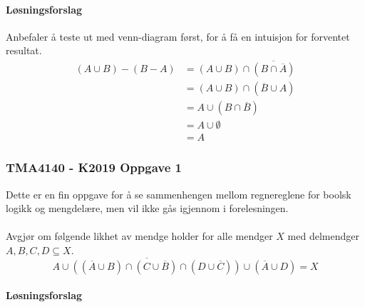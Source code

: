 \paragraph*{Løsningsforslag}
Anbefaler å teste ut med venn-diagram først, for å få en intuisjon for forventet resultat.
\begin{align*}
    (A\cup B)-(B-A) &= (A\cup B)\cap \overline{(B\cap\overline{A})}\\
    &= (A\cup B)\cap (\overline{B}\cup A)\\
    &= A\cup (B\cap \overline{B})\\
    &= A \cup \emptyset\\
    &= A
\end{align*}

\subsubsection{TMA4140 - K2019 Oppgave 1}

\qquad Dette er en fin oppgave for å se sammenhengen mellom regnereglene for boolsk logikk og mengdelære, men vil ikke gås igjennom i forelesningen. 
\\\\

Avgjør om følgende likhet av mendge holder for alle mendger $X$ med
delmendger $A,B,C,D \subseteq X$.
\[
\overline{A \cup ((\overline{A} \cup B)\cap (C\cup \overline{B})\cap (D\cup \overline{C}))} \cup (\overline{A} \cup D) = X   
\]

\paragraph*{Løsningsforslag} %